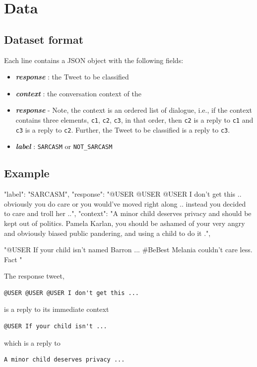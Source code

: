 \documentclass[conference]{IEEEtran}
\begin{document}
\section{Data}

\subsection{Dataset format}

Each line contains a JSON object with the following fields:

\begin{itemize}
	\item\textbf{\emph{response}} : the Tweet to be classified
	\item\textbf{\emph{context}} : the conversation context of the
	\item\textbf{\emph{response}} - Note, the context is an ordered list of dialogue, i.e., if the context contains three elements, \texttt{c1}, \texttt{c2}, \texttt{c3}, in that order, then \texttt{c2} is a reply to \texttt{c1} and \texttt{c3} is a reply to \texttt{c2}. Further, the Tweet to be classified is a reply to \texttt{c3}.
	\item\textbf{\emph{label}} : \texttt{SARCASM} or \texttt{NOT\_SARCASM}
\end{itemize}

\subsection{Example}

\begin{verbatimtab}[4]
"label": "SARCASM", 
"response": 
	"@USER @USER @USER I don't 
	get this .. obviously you do care
	or you would've moved right along ..
	instead you decided to care and
	troll her ..",
 "context": 
 	"A minor child deserves privacy and
	should be kept out of politics.
	Pamela Karlan, you should be ashamed
	of your very angry and obviously
	biased public pandering, and using a child
	to do it .",
	
	"@USER If your child isn't named Barron ...
	\#BeBest Melania couldn't care less. Fact "
	
\end{verbatimtab}


The response tweet, 
\begin{verbatim}
@USER @USER @USER I don't get this ...
\end{verbatim}
is a reply to its immediate context
\begin{verbatim}
@USER If your child isn't ...
\end{verbatim}
which is a reply to
\begin{verbatim}
A minor child deserves privacy ...
\end{verbatim}
\end{document}
